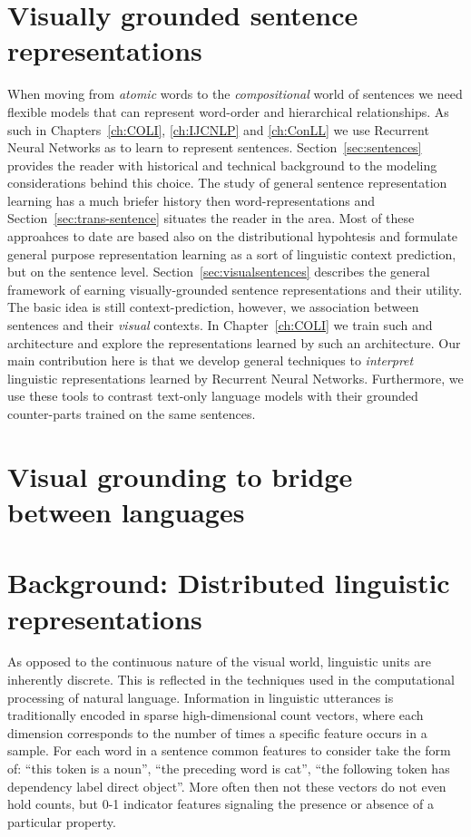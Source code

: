 \section{Visually grounded sentence representations}

When moving from \emph{atomic} words to the \emph{compositional} world of sentences we need flexible
models that can represent word-order and hierarchical relationships. As such in Chapters~\ref{ch:COLI}, \ref{ch:IJCNLP} and \ref{ch:ConLL} 
we use Recurrent Neural Networks as to learn to represent sentences. Section~\ref{sec:sentences} provides the reader with 
historical and technical background to the modeling considerations behind this choice.
The study of general sentence representation learning has a much briefer history then word-representations
and Section~\ref{sec:trans-sentence} situates the reader in the area. Most of these approahces to date are 
based also on the distributional hypohtesis and formulate general purpose representation learning as a sort of
linguistic context prediction, but on the sentence level. Section~\ref{sec:visualsentences}
describes the general framework of earning visually-grounded sentence representations and their utility. 
The basic idea is still context-prediction, however, we association between sentences and their \emph{visual} 
contexts. 
In Chapter~\ref{ch:COLI} we train such and architecture and explore the representations learned by such an architecture.
Our main contribution here is that we develop general techniques to \emph{interpret} linguistic representations learned by
Recurrent Neural Networks. Furthermore, we use these tools to contrast text-only language models with their grounded
counter-parts trained on the same sentences.

\section{Visual grounding to bridge between languages}





\section{Background: Distributed linguistic representations}
\label{introducion}
As opposed to the continuous nature of the visual world, linguistic units
are inherently discrete. This is reflected in the techniques used in the
computational processing of natural language.
Information in linguistic utterances is traditionally encoded
in sparse high-dimensional count vectors, where each
dimension corresponds to the number of times a specific feature occurs in a
sample. For each word in a sentence common features to consider take the form of:
``this token is a noun'', ``the preceding word is cat'',
``the following token has dependency label direct object''.
More often then not these vectors do not even hold counts, but 0-1
indicator features signaling the presence or absence of a particular property.

